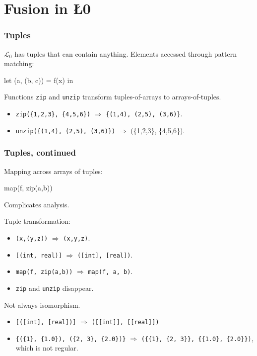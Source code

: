 \documentclass{beamer}
\newcommand{\LO}{$\mathcal{L}_0$}
\begin{document}
\section{Fusion in \L0{}}

\begin{frame}[fragile,t]
  \frametitle{Tuples}

  \LO{} has tuples that can contain anything.  Elements accessed
  through pattern matching:

\begin{colorcode}
  let (a, (b, c)) = f(x) in
\end{colorcode}

\pause

Functions {\tt zip} and {\tt unzip} transform tuples-of-arrays to
arrays-of-tuples.

\begin{itemize}
\item {\tt zip(\{1,2,3\}, \{4,5,6\})} $\Rightarrow$ {\tt \{(1,4),
    (2,5), (3,6)\}}.
\item {\tt unzip(\{(1,4), (2,5), (3,6)\})} $\Rightarrow$ (\{1,2,3\},
  \{4,5,6\}).
\end{itemize}

\end{frame}

\begin{frame}[fragile,t]
  \frametitle{Tuples, continued}

  Mapping across arrays of tuples:

  \begin{colorcode}
    map(f, zip(a,b))
  \end{colorcode}

  Complicates analysis.

\pause

Tuple transformation:

  \begin{itemize}
  \item {\tt (x,(y,z))} $\Rightarrow$ {\tt (x,y,z)}.
  \item {\tt [(int, real)]} $\Rightarrow$ {\tt ([int], [real])}.
  \item {\tt map(f, zip(a,b))} $\Rightarrow$ {\tt map(f, a, b)}.
  \item {\tt zip} and {\tt unzip} disappear.
  \end{itemize}

\pause

Not always isomorphism.

\begin{itemize}
\item {\tt [([int], [real])]} $\Rightarrow$ {\tt([[int]], [[real]])}
\item {\tt\{(\{1\}, \{1.0\}), (\{2, 3\}, \{2.0\})\}} $\Rightarrow$
  {\tt(\{\{1\}, \{2, 3\}\}, \{\{1.0\}, \{2.0\}\})}, which is not
  regular.
\end{itemize}

\end{frame}
\end{document}
